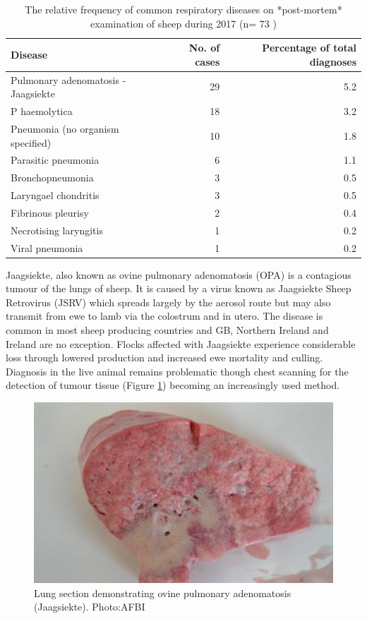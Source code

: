 \documentclass[]{book}
\begin{document}
\begin{table}

\caption{\label{tab:unnamed-chunk-86}The relative frequency of common respiratory diseases on *post-mortem* examination of sheep during 2017 (n= 73 )}
\centering
\begin{tabular}[t]{l|r|r}
\hline
Disease & No. of cases & Percentage of total diagnoses\\
\hline
Pulmonary adenomatosis - Jaagsiekte & 29 & 5.2\\
\hline
P haemolytica & 18 & 3.2\\
\hline
Pneumonia (no organism specified) & 10 & 1.8\\
\hline
Parasitic pneumonia & 6 & 1.1\\
\hline
Bronchopneumonia & 3 & 0.5\\
\hline
Laryngael chondritis & 3 & 0.5\\
\hline
Fibrinous pleurisy & 2 & 0.4\\
\hline
Necrotising laryngitis & 1 & 0.2\\
\hline
Viral pneumonia & 1 & 0.2\\
\hline
\end{tabular}
\end{table}

Jaagsiekte, also known as ovine pulmonary adenomatosis (OPA) is a
contagious tumour of the lungs of sheep. It is caused by a virus known
as Jaagsiekte Sheep Retrovirus (JSRV) which spreads largely by the
aerosol route but may also transmit from ewe to lamb via the colostrum
and in utero. The disease is common in most sheep producing countries
and GB, Northern Ireland and Ireland are no exception. Flocks affected
with Jaagsiekte experience considerable loss through lowered production
and increased ewe mortality and culling. Diagnosis in the live animal
remains problematic though chest scanning for the detection of tumour
tissue (Figure \ref{fig:foo}) becoming an increasingly used method.

\begin{figure}

{\centering \includegraphics[width=11.93in]{_images/Jaagsiekte} 

}

\caption{Lung section demonstrating ovine pulmonary adenomatosis (Jaagsiekte). Photo:AFBI}\label{fig:foo}
\end{figure}
\end{document}
